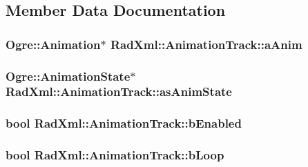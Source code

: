 \subsection{Member Data Documentation}
\hypertarget{class_rad_xml_1_1_animation_track_aedaca3ab10e43a4cc34ca8db0d071c9a}{
\subsubsection[{a\-Anim}]{\setlength{\rightskip}{0pt plus 5cm}Ogre\-::\-Animation$\ast$ Rad\-Xml\-::\-Animation\-Track\-::a\-Anim\hspace{0.3cm}{\ttfamily [protected]}}}\label{class_rad_xml_1_1_animation_track_aedaca3ab10e43a4cc34ca8db0d071c9a}
\hypertarget{class_rad_xml_1_1_animation_track_aa6d8252cfb633be1b27bf9771d7e93d0}{
\subsubsection[{as\-Anim\-State}]{\setlength{\rightskip}{0pt plus 5cm}Ogre\-::\-Animation\-State$\ast$ Rad\-Xml\-::\-Animation\-Track\-::as\-Anim\-State\hspace{0.3cm}{\ttfamily [protected]}}}\label{class_rad_xml_1_1_animation_track_aa6d8252cfb633be1b27bf9771d7e93d0}
\hypertarget{class_rad_xml_1_1_animation_track_adfaaa24505acea2fba79af09e0ec5822}{
\subsubsection[{b\-Enabled}]{\setlength{\rightskip}{0pt plus 5cm}bool Rad\-Xml\-::\-Animation\-Track\-::b\-Enabled\hspace{0.3cm}{\ttfamily [protected]}}}\label{class_rad_xml_1_1_animation_track_adfaaa24505acea2fba79af09e0ec5822}
\hypertarget{class_rad_xml_1_1_animation_track_a425fbf5b2d1b2987ae9a6ef87d0dfc73}{
\subsubsection[{b\-Loop}]{\setlength{\rightskip}{0pt plus 5cm}bool Rad\-Xml\-::\-Animation\-Track\-::b\-Loop\hspace{0.3cm}{\ttfamily [protected]}}}\label{class_rad_xml_1_1_animation_track_a425fbf5b2d1b2987ae9a6ef87d0dfc73}
